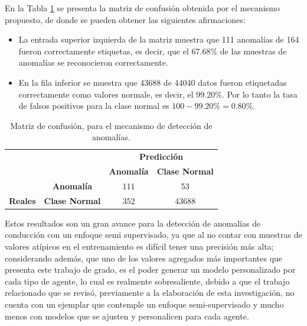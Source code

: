 \vspace{5mm} %

En la Tabla \ref{table:matriz_resultado} se presenta la matriz de confusi\'{o}n obtenida por el mecanismo propuesto, de donde se pueden obtener las siguientes afirmaciones:

\begin{itemize}
\item La entrada superior izquierda de la matriz muestra que 111 anomal\'{i}as de 164 fueron correctamente etiquetas, es decir, que el 67.68\% de las muestras de anomal\'{i}as se reconocieron correctamente.
\item En la fila inferior se muestra que 43688 de 44040 datos fueron etiquetadas correctamente como valores normale, es decir, el 99.20\%. Por lo tanto la tasa de falsos positivos para la clase normal es $100-99.20\% = 0.80\%$.
\end{itemize}

\begin{table}[H]

\centering
\begin{center}
\begin{tabular}{ll|c|c|}
\cline{3-4}
                                                        &                                              & \multicolumn{2}{c|}{\textbf{Predicci\'{o}n}}                                                          \\ \cline{3-4} 
                                                        &                                              & \textbf{Anomal\'{i}a}                         & \textbf{Clase Normal}                         \\ \hline
\multicolumn{1}{|c|}{}                                  & \multicolumn{1}{c|}{\textbf{Anomal\'{i}a}} & \cellcolor[HTML]{AADD99}111 & \cellcolor[HTML]{FFCE93}53 \\ \cline{2-4} 
\multicolumn{1}{|c|}{\multirow{-2}{*}{\textbf{Reales}}} & \multicolumn{1}{c|}{\textbf{Clase Normal}} & \cellcolor[HTML]{DF9F9F}352 & \cellcolor[HTML]{AADD99}43688 \\ \hline
\end{tabular}
\caption{Matriz de confusi\'{o}n, para el mecanismo de detecci\'{o}n de anomal\'{i}as.}
\label{table:matriz_resultado}
\end{center}
\end{table}

Estos resultados son un gran avance para la detecci\'{o}n de anomal\'{i}as de conducci\'{o}n con un enfoque semi supervisado, ya que al no contar con muestras de valores at\'{i}picos en el entrenamiento es dif\'{i}cil tener una precisi\'{o}n m\'{a}s alta; considerando adem\'{a}s, que uno de los valores agregados m\'{a}s importantes que presenta este trabajo de grado, es el poder generar un modelo personalizado por cada tipo de agente, lo cual es realmente sobresaliente, debido a que el trabajo relacionado que se revis\'{o}, previamente a la elaboraci\'{o}n de esta investigaci\'{o}n, no cuenta con un ejemplar que contemple un enfoque semi-supervisado y mucho menos con modelos que se ajusten y personalicen para cada agente.

